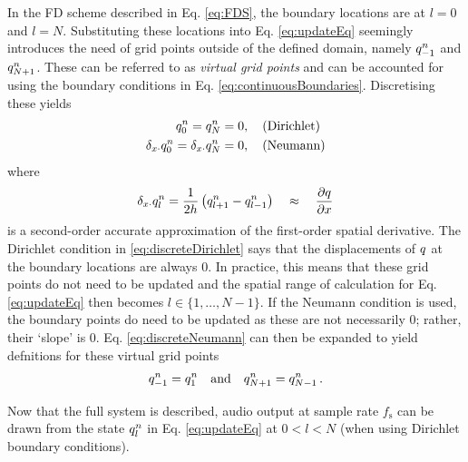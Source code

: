 In the FD scheme described in Eq. \eqref{eq:FDS}, the boundary locations are at $l = 0$ and $l = N$. Substituting these locations into Eq. \eqref{eq:updateEq} seemingly introduces the need of grid points outside of the defined domain, namely $q_{-1}^n$ and $q_{N+1}^n$. These can be referred to as \textit{virtual grid points} and can be accounted for using the boundary conditions in Eq. \eqref{eq:continuousBoundaries}. Discretising these yields
\begin{subequations}
    \begin{align}
        q_0^n = q_N^n &= 0, \quad\text{(Dirichlet)}\label{eq:discreteDirichlet}\\
        \delta_{x\cdot} q_0^n = \delta_{x\cdot} q_N^n &= 0, \quad \text{(Neumann)}\label{eq:discreteNeumann}
    \end{align}
\end{subequations}
where 
\begin{equation}
    \delta_{x\cdot}q_l^n = \frac{1}{2h}\left(q_{l+1}^n - q_{l-1}^n\right)\quad \approx\quad \frac{\partial q}{\partial x}
\end{equation}
is a second-order accurate approximation of the first-order spatial derivative. The Dirichlet condition in \eqref{eq:discreteDirichlet} says that the displacements of $q$ at the boundary locations are always 0. In practice, this means that these grid points do not need to be updated and the spatial range of calculation for Eq. \eqref{eq:updateEq} then becomes $l \in \{1, \hdots, N-1\}$. If the Neumann condition is used, the boundary points do need to be updated as these are not necessarily $0$; rather, their `slope' is $0$. Eq. \eqref{eq:discreteNeumann} can then be expanded to yield defnitions for these virtual grid points
\begin{equation}\label{eq:neumannSolution}
    q_{-1}^n = q_1^n \quad \text{and} \quad q_{N+1}^n = q_{N-1}^n\,.
\end{equation}

Now that the full system is described, audio output at sample rate $f_\text{s}$ can be drawn from the state $q_l^n$ in Eq. \eqref{eq:updateEq} at $0 < l < N$ (when using Dirichlet boundary conditions). %

